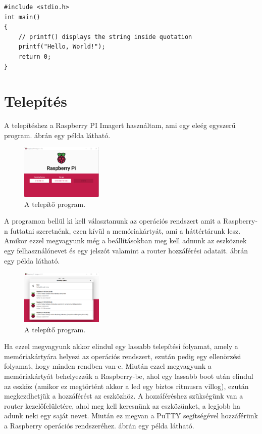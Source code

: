 \documentclass[a4paper,12pt,oneside]{report}
\begin{document}



\medskip

\begin{lstlisting}
#include <stdio.h>
int main()
{
	// printf() displays the string inside quotation
	printf("Hello, World!");
	return 0;
}
\end{lstlisting}

\chapter{Telepítés}

A telepítéshez a Raspberry PI Imagert használtam, ami egy eleég egyszerű program.
 ábrán egy példa látható.

\begin{figure}[htbp]
	\centering
	\includegraphics[width=0.35\textwidth]{fig/Imager.png}
	\caption{A telepítő program.}
	\label{fig-Imager}
\end{figure}
A programon bellül ki kell választanunk az operációs rendszert amit a Raspberry-n futtatni szeretnénk, ezen kívül a memóriakártyát, 
ami a háttértárunk lesz. Amikor ezzel megvagyunk még a beállításokban meg kell adnunk az eszköznek egy felhasználónevet és egy jelszót
valamint a router hozzáférési adatait.
 ábrán egy példa látható.

\begin{figure}[htbp]
	\centering
	\includegraphics[width=0.35\textwidth]{fig/os.png}
	\caption{A telepítő program.}
	\label{fig-os}
\end{figure}
Ha ezzel megvagyunk akkor elindul egy lassabb telepítési folyamat, amely a memóriakártyára helyezi az operációs rendszert, ezután pedig
egy ellenörzési folyamat, hogy minden rendben van-e.
Miután ezzel megvagyunk a memóriakártyát behelyezzük a Raspberry-be, ahol egy lassabb boot után elindul az eszköz (amikor ez megtörtént
akkor a led egy biztos ritmusra villog), ezután megkezdhetjük a hozzáférést az eszközhöz. 
A hozzáféréshez szükségünk van a router kezelőfelületére, ahol meg kell keresnünk az eszközünket, a legjobb ha adunk neki
egy saját nevet. Miután ez megvan a PuTTY segítségével hozzáférünk a Raspberry operációs rendszeréhez.
 ábrán egy példa látható.
\end{document}
